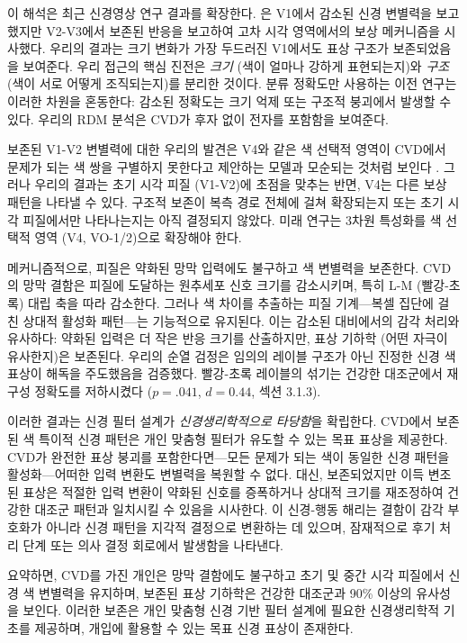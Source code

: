 \documentclass[12pt,a4paper]{article}
\begin{document}
이 해석은 최근 신경영상 연구 결과를 확장한다. \textcite{Tregillus2021}은 V1에서 감소된 신경 변별력을 보고했지만 V2-V3에서 보존된 반응을 보고하여 고차 시각 영역에서의 보상 메커니즘을 시사했다. 우리의 결과는 크기 변화가 가장 두드러진 V1에서도 표상 구조가 보존되었음을 보여준다. 우리 접근의 핵심 진전은 \emph{크기} (색이 얼마나 강하게 표현되는지)와 \emph{구조} (색이 서로 어떻게 조직되는지)를 분리한 것이다. 분류 정확도만 사용하는 이전 연구는 이러한 차원을 혼동한다: 감소된 정확도는 크기 억제 또는 구조적 붕괴에서 발생할 수 있다. 우리의 RDM 분석은 CVD가 후자 없이 전자를 포함함을 보여준다.

보존된 V1-V2 변별력에 대한 우리의 발견은 V4와 같은 색 선택적 영역이 CVD에서 문제가 되는 색 쌍을 구별하지 못한다고 제안하는 모델과 모순되는 것처럼 보인다 \parencite{Neitz2011}. 그러나 우리의 결과는 초기 시각 피질 (V1-V2)에 초점을 맞추는 반면, V4는 다른 보상 패턴을 나타낼 수 있다. 구조적 보존이 복측 경로 전체에 걸쳐 확장되는지 또는 초기 시각 피질에서만 나타나는지는 아직 결정되지 않았다. 미래 연구는 3차원 특성화를 색 선택적 영역 (V4, VO-1/2)으로 확장해야 한다.

메커니즘적으로, 피질은 약화된 망막 입력에도 불구하고 색 변별력을 보존한다. CVD의 망막 결함은 피질에 도달하는 원추세포 신호 크기를 감소시키며, 특히 L-M (빨강-초록) 대립 축을 따라 감소한다. 그러나 색 차이를 추출하는 피질 기계---복셀 집단에 걸친 상대적 활성화 패턴---는 기능적으로 유지된다. 이는 감소된 대비에서의 감각 처리와 유사하다: 약화된 입력은 더 작은 반응 크기를 산출하지만, 표상 기하학 (어떤 자극이 유사한지)은 보존된다. 우리의 순열 검정은 임의의 레이블 구조가 아닌 진정한 신경 색 표상이 해독을 주도했음을 검증했다. 빨강-초록 레이블의 섞기는 건강한 대조군에서 재구성 정확도를 저하시켰다 ($p=.041$, $d=0.44$, 섹션 3.1.3).

이러한 결과는 신경 필터 설계가 \emph{신경생리학적으로 타당함}을 확립한다. CVD에서 보존된 색 특이적 신경 패턴은 개인 맞춤형 필터가 유도할 수 있는 목표 표상을 제공한다. CVD가 완전한 표상 붕괴를 포함한다면---모든 문제가 되는 색이 동일한 신경 패턴을 활성화---어떠한 입력 변환도 변별력을 복원할 수 없다. 대신, 보존되었지만 이득 변조된 표상은 적절한 입력 변환이 약화된 신호를 증폭하거나 상대적 크기를 재조정하여 건강한 대조군 패턴과 일치시킬 수 있음을 시사한다. 이 신경-행동 해리는 결함이 감각 부호화가 아니라 신경 패턴을 지각적 결정으로 변환하는 데 있으며, 잠재적으로 후기 처리 단계 또는 의사 결정 회로에서 발생함을 나타낸다.

요약하면, CVD를 가진 개인은 망막 결함에도 불구하고 초기 및 중간 시각 피질에서 신경 색 변별력을 유지하며, 보존된 표상 기하학은 건강한 대조군과 90\% 이상의 유사성을 보인다. 이러한 보존은 개인 맞춤형 신경 기반 필터 설계에 필요한 신경생리학적 기초를 제공하며, 개입에 활용할 수 있는 목표 신경 표상이 존재한다.
\end{document}
